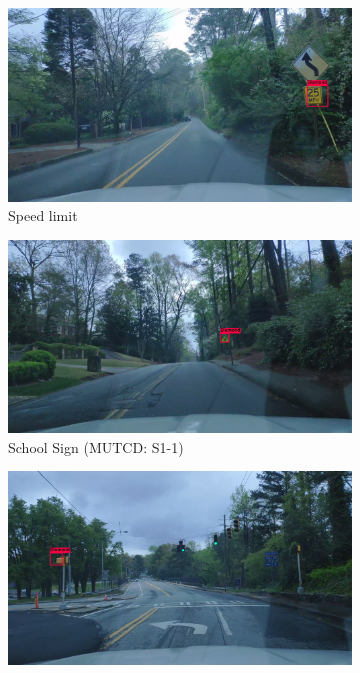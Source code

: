 \begin{figure}
\begin{center}
\begin{subfigure}[t]{.49\linewidth}
      \centering
      \includegraphics[width=0.99\linewidth]{figures/examples/westwestley/FN/FN01.jpg}
      \caption{Speed limit}
      \label{fig:wwslFP}
    \end{subfigure}
    \begin{subfigure}[t]{.49\linewidth}
      \centering
      \includegraphics[width=0.99\linewidth]{figures/examples/westwestley/FP/FP05.jpg}
      \caption{School Sign (MUTCD: S1-1)}
      \label{fig:wwSchoolFP}
    \end{subfigure}
    \begin{subfigure}[t]{.49\linewidth}
      \centering
      \includegraphics[width=0.99\linewidth]{figures/examples/westwestley/FP/FP06.jpg}

\end{subfigure}
\end{center}
\end{figure}

